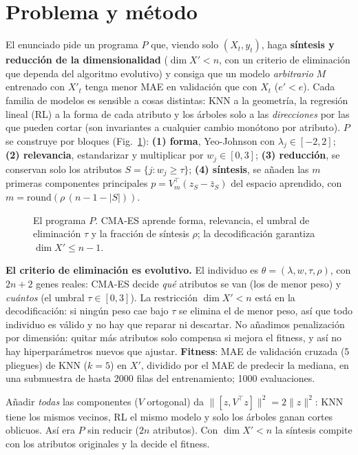 \documentclass[memoria,twocolumn]{uc3mmaster}
\begin{document}
\section{Problema y método}
El enunciado pide un programa $P$ que, viendo solo $(X_t,y_t)$, haga \textbf{síntesis y reducción de la
dimensionalidad} ($\dim X'<n$, con un criterio de eliminación que dependa del algoritmo evolutivo) y consiga que un
modelo \emph{arbitrario} $M$ entrenado con $X'_t$ tenga menor MAE en validación que con $X_t$ ($e'<e$). Cada familia
de modelos es sensible a cosas distintas: KNN a la geometría, la regresión lineal (RL) a la forma de cada atributo y
los árboles solo a las \emph{direcciones} por las que pueden cortar (son invariantes a cualquier cambio monótono por
atributo). $P$ se construye por bloques (Fig.~\ref{fig:esquema}): \textbf{(1) forma}, Yeo-Johnson con
$\lambda_j\in[-2,2]$; \textbf{(2) relevancia}, estandarizar y multiplicar por $w_j\in[0,3]$; \textbf{(3) reducción},
se conservan solo los atributos $S=\{j:w_j\ge\tau\}$; \textbf{(4) síntesis}, se añaden las $m$ primeras componentes
principales $p=V_m^\top(z_S-\bar z_S)$ del espacio aprendido, con $m=\mathrm{round}(\rho\,(n-1-|S|))$.

\begin{figure}[t]
\centering{}

\caption{El programa $P$. CMA-ES aprende forma, relevancia, el umbral de eliminación $\tau$ y la fracción de síntesis
$\rho$; la decodificación garantiza $\dim X'\le n-1$.}
\label{fig:esquema}
\end{figure}

\textbf{El criterio de eliminación es evolutivo.} El individuo es $\theta=(\lambda,w,\tau,\rho)$, con $2n+2$ genes
reales: CMA-ES decide \emph{qué} atributos se van (los de menor peso) y \emph{cuántos} (el umbral $\tau\in[0,3]$).
La restricción $\dim X'<n$ está en la decodificación: si ningún peso cae bajo $\tau$ se elimina el de menor peso, así
que todo individuo es válido y no hay que reparar ni descartar. No añadimos penalización por dimensión: quitar más
atributos solo compensa si mejora el fitness, y así no hay hiperparámetros nuevos que ajustar.
\textbf{Fitness}: MAE de validación cruzada (5 pliegues) de KNN ($k=5$) en $X'$, dividido por el MAE de predecir la
mediana, en una submuestra de hasta 2000 filas del entrenamiento; 1000 evaluaciones.

\begin{proposicion}\small
Añadir \emph{todas} las componentes ($V$ ortogonal) da $\lVert[z,V^\top z]\rVert^2=2\lVert z\rVert^2$: KNN tiene
los mismos vecinos, RL el mismo modelo y solo los árboles ganan cortes oblicuos. Así era $P$ sin reducir ($2n$
atributos). Con $\dim X'<n$ la síntesis compite con los atributos originales y la decide el fitness.
\end{proposicion}
\end{document}
